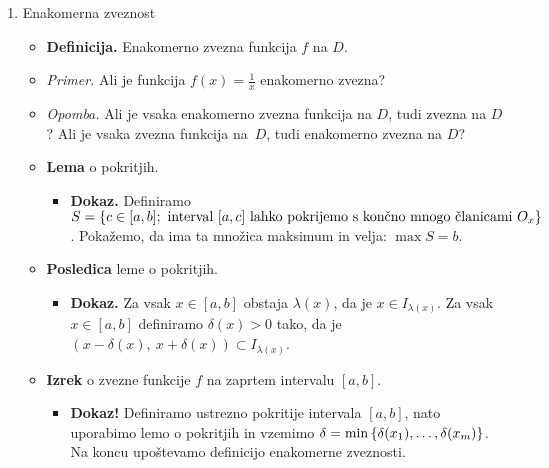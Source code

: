 \begin{enumerate}
\begin{itemize}
\begin{itemize}
            (3) Vpeljamo $a^h - 1 = \frac{1}{x}$.
        \end{itemize}
    \end{itemize}

    \newpage
    \item Enakomerna zveznost
    \begin{itemize}
        \item \colorbox{purple!30}{\textbf{Definicija.}} Enakomerno zvezna funkcija $f$ na $D$.
        \item \colorbox{yellow!30}{\emph{Primer.}} Ali je funkcija $f(x) = \frac{1}{x}$ enakomerno zvezna?
        \item \colorbox{yellow!30}{\emph{Opomba.}} Ali je vsaka enakomerno zvezna funkcija na $D$, tudi zvezna na $D$? Ali je vsaka zvezna funkcija na~$D$, tudi enakomerno zvezna na $D$?
        \item \colorbox{blue!30}{\textbf{Lema}} o pokritjih.
        \begin{itemize}
            \item \colorbox{green!30}{\textbf{Dokaz.}} Definiramo $S = \set{c \in [a,b]; \ \text{interval $[a,c]$ lahko pokrijemo s končno mnogo članicami $O_x$}}$. Pokažemo, da ima ta množica maksimum in velja: $\max S = b$.
        \end{itemize}
        \item \colorbox{orange!30}{\textbf{Posledica}} leme o pokritjih.   
        \begin{itemize}
            \item \colorbox{green!30}{\textbf{Dokaz.}} Za vsak $x \in [a,b]$ obstaja $\lambda(x)$, da je $x \in I_{\lambda(x)}$. Za vsak $x \in [a,b]$ definiramo $\delta(x) > 0$ tako, da je $(x - \delta(x), \ x + \delta(x)) \subset I_{\lambda(x)}$.
        \end{itemize}
        \item \colorbox{blue!30}{\textbf{Izrek}} o zvezne funkcije $f$ na zaprtem intervalu $[a,b]$.
        \begin{itemize}
            \item \colorbox{green!50}{\textbf{Dokaz!}} Definiramo ustrezno pokritije intervala $[a,b]$, nato uporabimo lemo o pokritjih in vzemimo $\delta = \min \left\{\delta(x_1), \ldots, \delta(x_m)\right\}$. Na koncu upoštevamo definicijo enakomerne zveznosti.
        \end{itemize}
    \end{itemize}


\end{enumerate}
